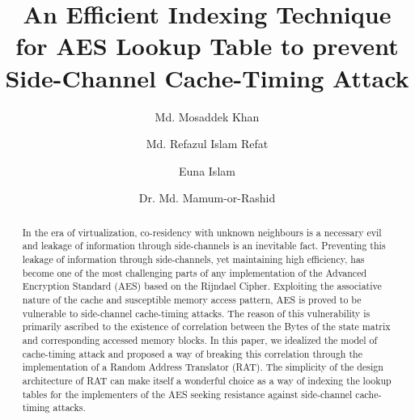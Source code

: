 \documentclass[3p]{elsarticle}
\begin{document}
\begin{frontmatter}

\title{An Efficient Indexing Technique for AES Lookup Table to prevent Side-Channel Cache-Timing Attack}






\author[label1]{Md. Mosaddek Khan}
\author[label1]{Md. Refazul Islam Refat}
\author[label1]{Euna Islam}
\author[label1]{Dr. Md. Mamum-or-Rashid}


\address[label1]{Department of Computer Science and Engineering, University of Dhaka, Bangladesh}


\begin{abstract}
In the era of virtualization, co-residency with unknown neighbours is a necessary evil and leakage of information through side-channels is an inevitable fact. Preventing this leakage of information through side-channels, yet maintaining high efficiency, has become one of the most challenging parts of any implementation of the Advanced Encryption Standard (AES) based on the Rijndael Cipher. Exploiting the associative nature of the cache and susceptible memory access pattern, AES is proved to be vulnerable to side-channel cache-timing attacks. The reason of this vulnerability is primarily ascribed to the existence of correlation between the Bytes of the state matrix and corresponding accessed memory blocks. In this paper, we idealized the model of cache-timing attack and proposed a way of breaking this correlation through the implementation of a Random Address Translator (RAT). The simplicity of the design architecture of RAT can make itself a wonderful choice as a way of indexing the lookup tables for the implementers of the AES seeking resistance against side-channel cache-timing attacks.
\end{abstract}


\end{frontmatter}
\end{document}
